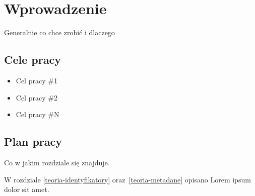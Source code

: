 \chapter{Wprowadzenie}


\par
Generalnie co chce zrobić i dlaczego


\section{Cele pracy}
\begin{itemize}
\item Cel pracy \#1
\item Cel pracy \#2
\item Cel pracy \#N
\end{itemize}

\clearpage
\section{Plan pracy}

Co w jakim rozdziale się znajduje.

W rozdziale \ref{teoria-identyfikatory} oraz~\ref{teoria-metadane} opisano Lorem ipsum dolor sit amet.

